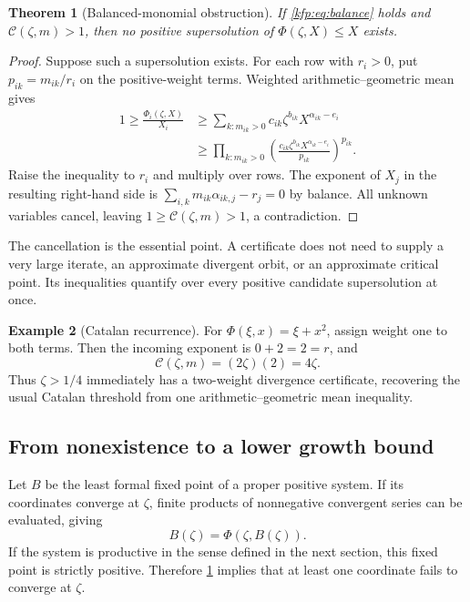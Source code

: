 \documentclass[11pt,a4paper]{article}
\newtheorem{theorem}{Theorem}[section]
\theoremstyle{definition}
\newtheorem{example}[theorem]{Example}
\theoremstyle{remark}
\begin{document}
\begin{theorem}[Balanced-monomial obstruction]\label{kfp:thm:dual}
If \eqref{kfp:eq:balance} holds and $\mathcal C(\zeta,m)>1$, then no positive
supersolution of $\Phi(\zeta,X)\leq X$ exists.
\end{theorem}
\begin{proof}
Suppose such a supersolution exists. For each row with $r_i>0$, put
$p_{ik}=m_{ik}/r_i$ on the positive-weight terms. Weighted arithmetic--geometric
mean gives
\begin{align*}
 1\geq\frac{\Phi_i(\zeta,X)}{X_i}
 &\geq\sum_{k:m_{ik}>0}
        c_{ik}\zeta^{b_{ik}}X^{\alpha_{ik}-e_i}\\
 &\geq\prod_{k:m_{ik}>0}
 \left(\frac{c_{ik}\zeta^{b_{ik}}
                  X^{\alpha_{ik}-e_i}}{p_{ik}}\right)^{p_{ik}}.
\end{align*}
Raise the inequality to $r_i$ and multiply over rows. The exponent of $X_j$
in the resulting right-hand side is
$\sum_{i,k}m_{ik}\alpha_{ik,j}-r_j=0$ by balance.
All unknown variables cancel, leaving
$1\geq\mathcal C(\zeta,m)>1$, a contradiction.
\end{proof}

The cancellation is the essential point. A certificate does not need to
supply a very large iterate, an approximate divergent orbit, or an
approximate critical point. Its inequalities quantify over every positive
candidate supersolution at once.

\begin{example}[Catalan recurrence]
For $\Phi(\xi,x)=\xi+x^2$, assign weight one to both terms.
Then the incoming exponent is $0+2=2=r$, and
\[
 \mathcal C(\zeta,m)=(2\zeta)(2)=4\zeta.
\]
Thus $\zeta>1/4$ immediately has a two-weight divergence certificate, recovering
the usual Catalan threshold from one arithmetic--geometric mean inequality.
\end{example}

\subsection{From nonexistence to a lower growth bound}
Let $B$ be the least formal fixed point of a proper positive system. If its
coordinates converge at $\zeta$, finite products of nonnegative convergent
series can be evaluated, giving
\[
 B(\zeta)=\Phi(\zeta,B(\zeta)).
\]
If the system is productive in the sense defined in the next section, this
fixed point is strictly positive. Therefore \cref{kfp:thm:dual} implies that at
least one coordinate fails to converge at $\zeta$.
\end{document}
